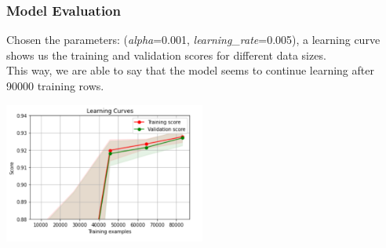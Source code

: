\subsubsection{Model Evaluation}
Chosen the parameters: (\emph{alpha}=0.001, \emph{learning\_rate}=0.005), a learning curve shows us the training and validation scores for different data sizes.\\
This way, we are able to say that the model seems to continue learning after 90000 training rows.
\begin{center}
    \captionsetup{type=figure}
    \includegraphics[width=250px]{learning_curve_mlp.png}
\end{center}
